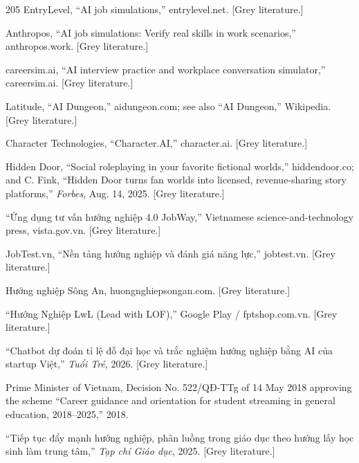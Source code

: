 \begin{thebibliography}{205}
 EntryLevel, ``AI job simulations,'' entrylevel.\allowbreak{}net. [Grey literature.\allowbreak{}]

 Anthropos, ``AI job simulations: Verify real skills in work scenarios,'' anthropos.\allowbreak{}work. [Grey literature.\allowbreak{}]

 careersim.\allowbreak{}ai, ``AI interview practice and workplace conversation simulator,'' careersim.\allowbreak{}ai. [Grey literature.\allowbreak{}]

 Latitude, ``AI Dungeon,'' aidungeon.\allowbreak{}com; see also ``AI Dungeon,'' Wikipedia. [Grey literature.\allowbreak{}]

 Character Technologies, ``Character.\allowbreak{}AI,'' character.\allowbreak{}ai. [Grey literature.\allowbreak{}]

 Hidden Door, ``Social roleplaying in your favorite fictional worlds,'' hiddendoor.\allowbreak{}co; and C. Fink, ``Hidden Door turns fan worlds into licensed, revenue-\allowbreak{}sharing story platforms,'' \textit{Forbes}, Aug. 14, 2025. [Grey literature.\allowbreak{}]

 ``Ứng dụng tư vấn hướng nghiệp 4.0 JobWay,'' Vietnamese science-\allowbreak{}and-\allowbreak{}technology press, vista.\allowbreak{}gov.\allowbreak{}vn. [Grey literature.\allowbreak{}]

 JobTest.vn, ``Nền tảng hướng nghiệp và đánh giá năng lực,'' jobtest.vn. [Grey literature.\allowbreak{}]

 Hướng nghiệp Sông An, huongnghiepsongan.\allowbreak{}com. [Grey literature.\allowbreak{}]

 ``Hướng Nghiệp LwL (Lead with LOF),'' Google Play / fptshop.\allowbreak{}com.\allowbreak{}vn. [Grey literature.\allowbreak{}]

 ``Chatbot dự đoán tỉ lệ đỗ đại học và trắc nghiệm hướng nghiệp bằng AI của startup Việt,'' \textit{Tuổi Trẻ}, 2026. [Grey literature.\allowbreak{}]

 Prime Minister of Vietnam, Decision No. 522/QĐ-TTg of 14 May 2018 approving the scheme ``Career guidance and orientation for student streaming in general education, 2018--2025,'' 2018.

 ``Tiếp tục đẩy mạnh hướng nghiệp, phân luồng trong giáo dục theo hướng lấy học sinh làm trung tâm,'' \textit{Tạp chí Giáo dục}, 2025. [Grey literature.\allowbreak{}]


\end{thebibliography}
